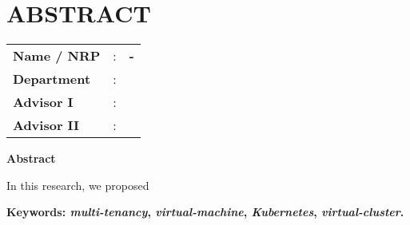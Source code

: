 \chapter*{ABSTRACT}


\vspace{2ex}

\begin{center}
  \large\textbf{\engtatitle{}}
\end{center}

\vspace{2ex}

\begingroup
\setlength{\tabcolsep}{0pt}

\noindent
\begin{tabularx}{\textwidth}{l >{\centering}m{3em} X}
  \textbf{Name / NRP}   & : & \textbf{\name{} - \nrp{}} \\
  \textbf{Department}   & : & \textbf{\engdepartment{}} \\
  \textbf{Advisor I}   & : & \textbf{\advisor{}}       \\
  \textbf{Advisor II}  & : & \textbf{\coadvisor{}}     \\
\end{tabularx}
\endgroup

\noindent
\textbf{Abstract}

In this research, we proposed \lipsum[1]

\vspace{2ex}
\noindent
\textbf{Keywords: \emph{multi-tenancy}, \emph{virtual-machine}, \emph{Kubernetes}, \emph{virtual-cluster}.}
